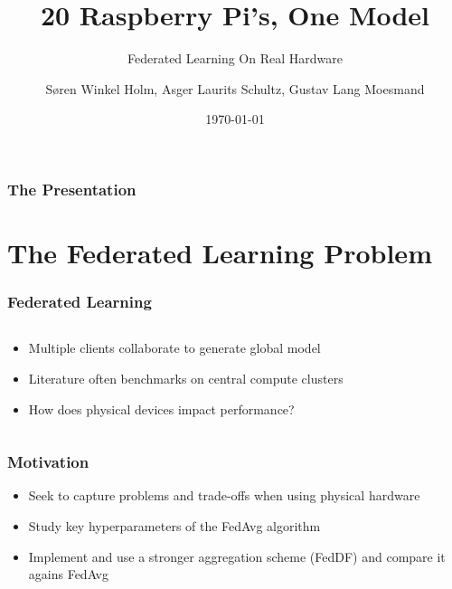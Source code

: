 \documentclass{beamer}
\title{20 Raspberry Pi's, One Model}
\subtitle{
    Federated Learning On Real Hardware
}
\author[Søren Holm, Asger Schultz, Gustav Moesmand]
{Søren Winkel Holm, Asger Laurits Schultz, Gustav Lang Moesmand}
\institute[DTU]{Technical University of Denmark}
\date{\today}
\begin{document}
\begin{frame}
    \titlepage
\end{frame}

\begin{frame}
    \frametitle{The Presentation}
    \footnotesize
    \tableofcontents
\end{frame}

\section{The Federated Learning Problem}
\begin{frame}
	\frametitle{Federated Learning}
	\noindent
	\begin{columns}
		\begin{column}{.5\textwidth}
			\begin{itemize}
				\item Multiple clients collaborate to generate global model
				\item Literature often benchmarks on central compute clusters
				\item How does physical devices impact performance?
			\end{itemize}
		\end{column}
		\begin{column}{.5\textwidth}
			\begin{figure}
    				\centering
				\scalebox{.6}{}
			\end{figure}
		\end{column}
	\end{columns}
\end{frame}

\begin{frame}
	\frametitle{Motivation}
			\begin{itemize}
				\item Seek to capture problems and trade-offs when using physical hardware
				\item Study key hyperparameters of the FedAvg algorithm
				\item Implement and use a stronger aggregation scheme (FedDF) and compare it agains FedAvg
			\end{itemize}
\end{frame}
\end{document}
